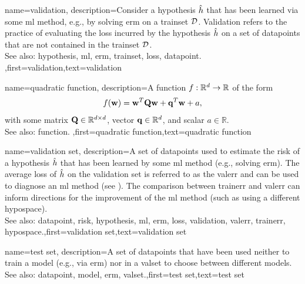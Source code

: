 {name={validation},
	description={Consider a \gls{hypothesis} $\hat{h}$ that has been 
		learned via some \gls{ml} method, e.g., by solving \gls{erm} on a \gls{trainset} $\mathcal{D}$. 
		Validation refers to the practice of evaluating the \gls{loss} incurred by the 
		\gls{hypothesis} $\hat{h}$ on a set of 
		\glspl{datapoint} that are not contained in the \gls{trainset} $\mathcal{D}$.
				\\
		See also: \gls{hypothesis}, \gls{ml}, \gls{erm}, \gls{trainset}, \gls{loss}, \gls{datapoint}. },first={validation},text={validation}  
}

{name={quadratic function},
	description={A \gls{function} $f: \mathbb{R}^{d} \rightarrow \mathbb{R}$ of the form 
	$$f({\bf w}) =  {\bf w}^{T} \mathbf{Q} \mathbf{w} + \mathbf{q}^{T} {\bf w}+a,$$ with 
	some matrix $\mathbf{Q} \in \mathbb{R}^{d \times d}$, vector ${\bf q} \in \mathbb{R}^{d}$, 
	and scalar $a \in \mathbb{R}$.
	\\
	See also: \gls{function}. },first={quadratic function},text={quadratic function}  
}

{name={validation set},
  description={A set of \glspl{datapoint} used to estimate 
  	the \gls{risk} of a \gls{hypothesis} $\hat{h}$ that has been learned by some 
  	\gls{ml} method (e.g., solving \gls{erm}). The average \gls{loss} of $\hat{h}$ 
  	on the \gls{validation} set is referred to as the \gls{valerr} and can be used to diagnose an 
  	\gls{ml} method (see \cite[Sec. 6.6]{MLBasics}). The comparison between \gls{trainerr} 
  	and \gls{valerr} can inform directions for the improvement of the \gls{ml} method (such as 
  	using a different \gls{hypospace}).
			\\
		See also: \gls{datapoint}, \gls{risk}, \gls{hypothesis}, \gls{ml}, \gls{erm}, \gls{loss}, \gls{validation}, \gls{valerr}, \gls{trainerr}, \gls{hypospace}.},first={validation set},text={validation set}  
}

{name={test set},
	description={A set of \glspl{datapoint} that have  
		been used neither to train a \gls{model} (e.g., via \gls{erm}) nor in a \gls{valset} 
		to choose between different \glspl{model}.
				\\
		See also: \gls{datapoint}, \gls{model}, \gls{erm}, \gls{valset}.},first={test set},text={test set}  
}



